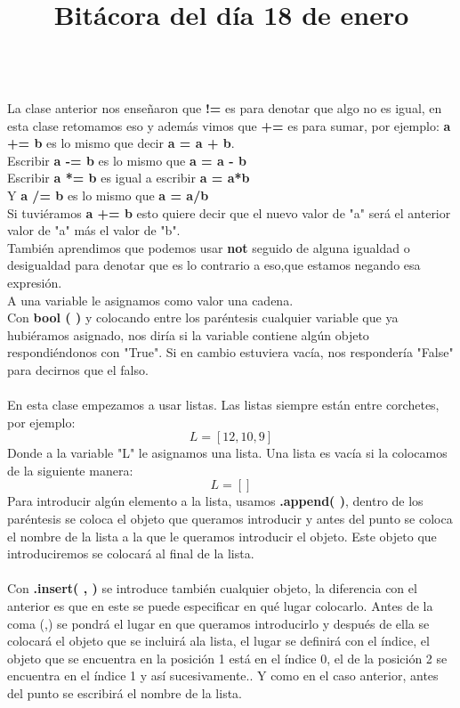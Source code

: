 \documentclass{article}
\begin{document}
	\title{\huge\textbf{Bitácora del día 18 de enero}} \\
	La clase anterior nos enseñaron que \textbf{!=} es para denotar que algo no es igual, en esta clase retomamos eso y además vimos que \textbf{+=} es para sumar, por ejemplo: \textbf{a += b} es lo mismo que decir \textbf{a = a + b}. \\
	Escribir \textbf{a -= b} es lo mismo que \textbf{a = a - b} \\
	Escribir \textbf{a *= b} es igual a escribir \textbf{a = a*b} \\
	Y \textbf{a /= b } es lo mismo que \textbf{a = a/b} \\
	Si tuviéramos \textbf{a += b} esto quiere decir que el nuevo valor de "a" será el anterior valor de "a" más el valor de "b".\\
	También aprendimos que podemos usar \textbf{not} seguido de alguna igualdad o desigualdad para denotar que es lo contrario a eso,que estamos negando esa expresión. \\
	A una variable le asignamos como valor una cadena. \\
	Con \textbf{bool ( )} y colocando entre los paréntesis cualquier variable que ya hubiéramos asignado, nos diría si la variable contiene algún objeto respondiéndonos con "True". Si en cambio estuviera vacía, nos respondería "False" para decirnos que el falso. \\ \\
	En esta clase empezamos a usar listas. Las listas siempre están entre corchetes, por ejemplo: \[ L = [12, 10, 9]  \]
	Donde a la variable "L" le asignamos una lista. Una lista es vacía si la colocamos de la siguiente manera:  \[ L = []  \]
	Para introducir algún elemento a la lista, usamos \textbf{.append( )}, dentro de los paréntesis se coloca el objeto que queramos introducir y antes del punto se coloca el nombre de la lista a la que le queramos introducir el objeto. Este objeto que introduciremos se colocará al final de la lista. \\ \\
	Con \textbf{.insert( , )} se introduce también cualquier objeto, la diferencia con el anterior es que en este se puede especificar en qué lugar colocarlo. Antes de la coma (,) se pondrá el lugar en que queramos introducirlo y después de ella se colocará el objeto que se incluirá ala lista, el lugar se definirá con el índice, el objeto que se encuentra en la posición 1 está en el índice 0, el de la posición 2 se encuentra en el índice 1 y así sucesivamente.. Y como en el caso anterior, antes del punto se escribirá el nombre de la lista. \\ \\
\end{document}
